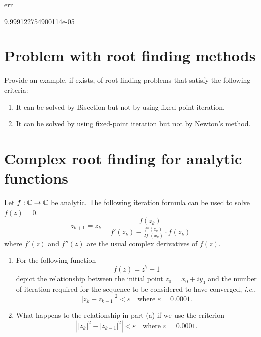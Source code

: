 err =

     9.999122754900114e-05
 








\section{Problem with root finding methods}
Provide an example, if exists, of root-finding problems that satisfy the following criteria:
\begin{enumerate}
	\item It can be solved by Bisection but not by using fixed-point iteration.
	\item It can be solved by using fixed-point iteration but not by Newton's method.
\end{enumerate}


\section{Complex root finding for analytic functions}
Let \(f:\mathbb{C}\to\mathbb{C}\) be analytic.
The following iteration formula can be used to solve \(f(z)=0\).
\[ z_{k+1}=z_k-\frac{f(z_k)}{f'(z_k)-\frac{f''(z_k)}{2f'(x_k)}\cdot f(z_k)} \]
where \(f'(z)\) and \(f''(z)\) are the usual complex derivatives of \(f(z)\).
\begin{enumerate}
	\item For the following function
	\[ f(z)=z^7-1 \]
	depict the relationship between the initial point \(z_0=x_0+i y_0\) and the number of iteration required for the sequence to be considered to have converged, \textit{i.e.},
	\[ |z_k - z_{k-1}|^2 < \varepsilon \quad \text{where } \varepsilon=0.0001. \]
	\item What happens to the relationship in part (a) if we use the criterion 
	\[ \left| |z_k|^2 - |z_{k-1}|^2\right| < \varepsilon \quad \text{where } \varepsilon=0.0001. \]
\end{enumerate}
